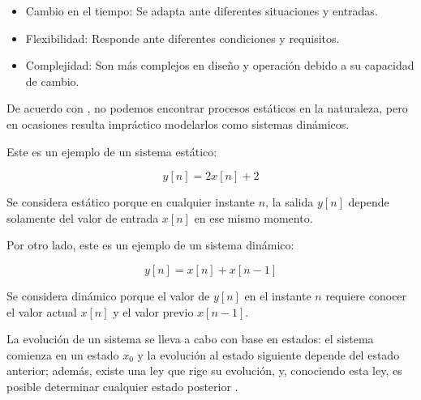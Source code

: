 \begin{itemize}
	\item Cambio en el tiempo: Se adapta ante diferentes situaciones y entradas.
	\item Flexibilidad: Responde ante diferentes condiciones y requisitos.
	\item Complejidad: Son más complejos en diseño y operación debido a su capacidad de cambio.
\end{itemize}

De acuerdo con \cite{Cordero2025_dinamico}, no podemos encontrar procesos estáticos en la naturaleza, pero en ocasiones resulta impráctico modelarlos como sistemas dinámicos.

Este es un ejemplo de un sistema estático:

\begin{equation*}
	y[n] = 2x[n] + 2
\end{equation*}

Se considera estático porque en cualquier instante $n$, la salida $y[n]$ depende solamente del valor de entrada $x[n]$ en ese mismo momento.

Por otro lado, este es un ejemplo de un sistema dinámico:

\begin{equation*}
	y[n] = x[n] + x[n-1]
\end{equation*}

Se considera dinámico porque el valor de $y[n]$ en el instante $n$ requiere conocer el valor actual $x[n]$ y el valor previo $x[n-1]$.

La evolución de un sistema se lleva a cabo con base en estados: el sistema comienza en un estado $x_0$ y la evolución al estado siguiente depende del estado anterior; además, existe una ley que rige su evolución, y, conociendo esta ley, es posible determinar cualquier estado posterior \cite{Alberto2021_dinamico}.

